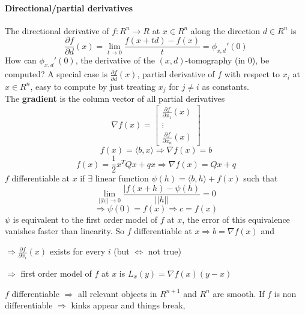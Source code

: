 \documentclass[10pt]{report}
\begin{document}
\paragraph{Directional/partial derivatives} The directional derivative of $f:R^n\rightarrow R$ at $x\in R^n$ along the direction $d\in R^n$ is $$\frac{\partial f}{\partial d}(x) = \lim_{t\to 0}\frac{f(x+td) - f(x)}{t} = \phi_{x,d}'(0)$$
How can $\phi_{x,d}'(0)$, the derivative of the $(x,d)$-tomography (in 0), be computed? A special case is $\frac{\partial f}{\partial d}(x)$, partial derivative of $f$ with respect to $x_i$ at $x\in R^n$, easy to compute by just treating $x_j$ for $j\neq i$ as constants.\\
The \textbf{gradient} is the column vector of all partial derivatives $$\nabla f(x) = \left[\begin{array}{c}
\frac{\partial f}{\partial x_1}(x)\\
\vdots\\
\frac{\partial f}{\partial x_n}(x)
\end{array}\right]$$
$$f(x) = \langle b,x\rangle \Rightarrow\nabla f(x) = b$$
$$f(x) = \frac{1}{2}x^TQx + qx \Rightarrow\nabla f(x) = Qx + q$$
$f$ differentiable at $x$ if $\exists$ linear function $\psi(h) =\langle b,h\rangle + f(x)$ such that $$\lim_{||h||\to 0}\frac{|f(x+h) - \psi(h)}{||h||} = 0$$ $$\Rightarrow \psi(0) = f(x) \Rightarrow c = f(x)$$
$\psi$ is equivalent to the first order model of $f$ at $x$, the error of this equivalence vanishes faster than linearity. So $f$ differentiable at $x\Rightarrow b = \nabla f(x)$ and\begin{list}{}{}
	\item $\Rightarrow \frac{\partial f}{\partial x_i}(x)$ exists for every $i$ (but $\Leftrightarrow$ not true)
	\item $\Rightarrow$ first order model of $f$ at $x$ is $L_x(y) = \nabla f(x)(y-x)$
\end{list}
$f$ differentiable $\Rightarrow$ all relevant objects in $R^{n+1}$ and $R^n$ are smooth. If $f$ is non differentiable $\Rightarrow$ kinks appear and things break,
\end{document}
